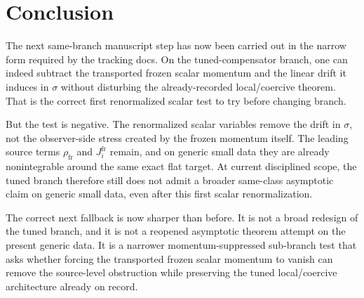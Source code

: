 \documentclass[11pt]{article}
\begin{document}
\section{Conclusion}

The next same-branch manuscript step has now been carried out in the narrow form required by the tracking docs. On the tuned-compensator branch, one can indeed subtract the transported frozen scalar momentum and the linear drift it induces in \(\sigma\) without disturbing the already-recorded local/coercive theorem. That is the correct first renormalized scalar test to try before changing branch.

But the test is negative. The renormalized scalar variables remove the drift in \(\sigma\), not the observer-side stress created by the frozen momentum itself. The leading source terms \(\rho_{\mathrm{fr}}\) and \(J_i^{\mathrm{fr}}\) remain, and on generic small data they are already nonintegrable around the same exact flat target. At current disciplined scope, the tuned branch therefore still does not admit a broader same-class asymptotic claim on generic small data, even after this first scalar renormalization.

The correct next fallback is now sharper than before. It is not a broad redesign of the tuned branch, and it is not a reopened asymptotic theorem attempt on the present generic data. It is a narrower momentum-suppressed sub-branch test that asks whether forcing the transported frozen scalar momentum to vanish can remove the source-level obstruction while preserving the tuned local/coercive architecture already on record.
\end{document}

